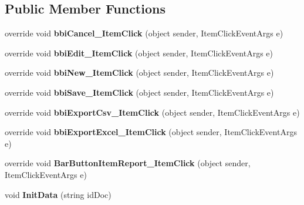 \subsection*{Public Member Functions}
\begin{DoxyCompactItemize}
\item 
\mbox{\label{class_h_k_supply_1_1_forms_1_1_supply_1_1_packing_list_ad74b2ff0a6c56b75ca3825e5de6149db}} 
override void {\bfseries bbi\+Cancel\+\_\+\+Item\+Click} (object sender, Item\+Click\+Event\+Args e)
\item 
\mbox{\label{class_h_k_supply_1_1_forms_1_1_supply_1_1_packing_list_a6876175233bce57209c7cd144973b1f2}} 
override void {\bfseries bbi\+Edit\+\_\+\+Item\+Click} (object sender, Item\+Click\+Event\+Args e)
\item 
\mbox{\label{class_h_k_supply_1_1_forms_1_1_supply_1_1_packing_list_ae037b634643249e624fbc920411b291d}} 
override void {\bfseries bbi\+New\+\_\+\+Item\+Click} (object sender, Item\+Click\+Event\+Args e)
\item 
\mbox{\label{class_h_k_supply_1_1_forms_1_1_supply_1_1_packing_list_a5a52f82a2012ee16af69234a8d8e2f1d}} 
override void {\bfseries bbi\+Save\+\_\+\+Item\+Click} (object sender, Item\+Click\+Event\+Args e)
\item 
\mbox{\label{class_h_k_supply_1_1_forms_1_1_supply_1_1_packing_list_ad950fadaf3f4809043f8e78218363e21}} 
override void {\bfseries bbi\+Export\+Csv\+\_\+\+Item\+Click} (object sender, Item\+Click\+Event\+Args e)
\item 
\mbox{\label{class_h_k_supply_1_1_forms_1_1_supply_1_1_packing_list_abb76e89f3f632bd65e8305d2e921a988}} 
override void {\bfseries bbi\+Export\+Excel\+\_\+\+Item\+Click} (object sender, Item\+Click\+Event\+Args e)
\item 
\mbox{\label{class_h_k_supply_1_1_forms_1_1_supply_1_1_packing_list_ad8c7e2de9c27570b03f2a0e57fd7521b}} 
override void {\bfseries Bar\+Button\+Item\+Report\+\_\+\+Item\+Click} (object sender, Item\+Click\+Event\+Args e)
\item 
\mbox{\label{class_h_k_supply_1_1_forms_1_1_supply_1_1_packing_list_aa1fb263dbf241bd431ab624f6bcdae79}} 
void {\bfseries Init\+Data} (string id\+Doc)
\end{DoxyCompactItemize}
